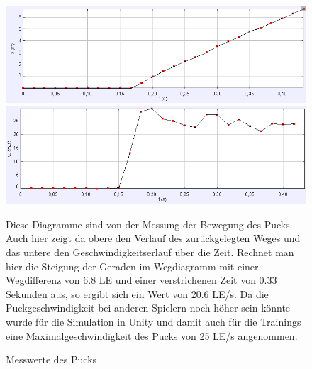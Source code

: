 \begin{figure}
\includegraphics[width=\textwidth]{images/messung_bolzen_x}
\includegraphics[width=\textwidth]{images/messung_bolzen_v}
 \caption{Messwerte des Pucks}
 \label{mess_puck}
Diese Diagramme sind von der Messung der Bewegung des Pucks. Auch hier zeigt da obere den Verlauf des zurückgelegten Weges und das untere den Geschwindigkeitserlauf über die Zeit. Rechnet man hier die Steigung der Geraden im Wegdiagramm mit einer Wegdifferenz von 6.8 LE und einer verstrichenen Zeit von 0.33 Sekunden aus, so ergibt sich ein Wert von 20.6 LE/s. Da die Puckgeschwindigkeit bei anderen Spielern noch höher sein könnte wurde für die Simulation in Unity und damit auch für die Trainings eine Maximalgeschwindigkeit des Pucks von 25 LE/s angenommen. 
\end{figure}

